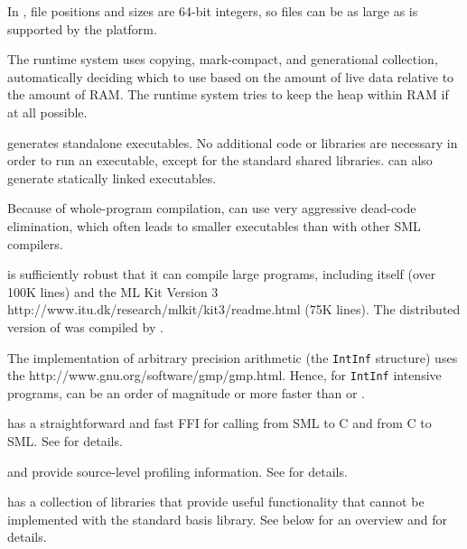\begin{description}
In {\mlton}, file positions and sizes are 64-bit integers, so files
can be as large as is supported by the platform.

The {\mlton} runtime system uses copying, mark-compact, and generational
collection, automatically deciding which to use based on the amount of live
data relative to the amount of RAM.  The runtime system tries to keep the heap
within RAM if at all possible.

{\mlton} generates standalone executables.  No additional code or
libraries are necessary in order to run an executable, except for
the standard shared libraries.  {\mlton} can also generate statically
linked executables.

Because of whole-program compilation, {\mlton} can use very aggressive 
dead-code elimination, which often leads to smaller executables than
with other SML compilers.

{\mlton} is sufficiently robust that it can compile large programs,
including itself (over 100K lines) and the
\htmladdnormallink
  {ML Kit Version 3}
  {http://www.itu.dk/research/mlkit/kit3/readme.html}
(75K lines).
The distributed version of {\mlton} was compiled by {\mlton}.

The {\mlton} implementation of arbitrary precision arithmetic (the
{\tt IntInf} structure) uses the
		  {http://www.gnu.org/software/gmp/gmp.html}.
Hence, for {\tt IntInf} intensive programs, {\mlton} can be an order
of magnitude or more faster than {\poly} or {\smlnj}.

{\mlton} has a straightforward and fast FFI for calling from SML to C
and from C to SML.  See  for details.

{\mlton} and {\mlprof} provide source-level profiling information.
See  for details.

{\mlton} has a collection of libraries that provide useful functionality that
cannot be implemented with the standard basis library.  See below for an
overview and  for details.

\begin{description}


\end{description}
\end{description}
